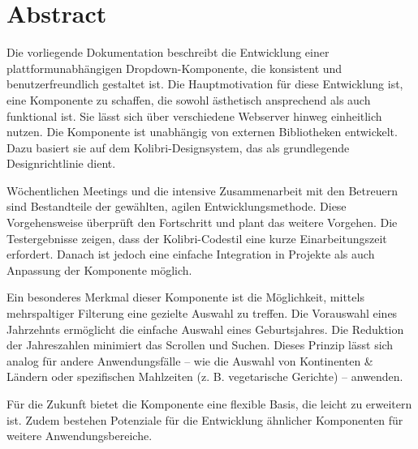 \chapter*{Abstract}

Die vorliegende Dokumentation beschreibt die Entwicklung einer plattformunabhängigen Dropdown-Komponente, die konsistent und benutzerfreundlich gestaltet ist. 
Die Hauptmotivation für diese Entwicklung ist, eine Komponente zu schaffen, die sowohl ästhetisch ansprechend als auch funktional ist. 
Sie lässt sich über verschiedene Webserver hinweg einheitlich nutzen. 
Die Komponente ist unabhängig von externen Bibliotheken entwickelt. 
Dazu basiert sie auf dem Kolibri-Designsystem, das als grundlegende Designrichtlinie dient. 

Wöchentlichen Meetings und die intensive Zusammenarbeit mit den Betreuern sind Bestandteile der gewählten, agilen Entwicklungsmethode. 
Diese Vorgehensweise überprüft den Fortschritt und plant das weitere Vorgehen. 
Die Testergebnisse zeigen, dass der Kolibri-Codestil eine kurze Einarbeitungszeit erfordert. 
Danach ist jedoch eine einfache Integration in Projekte als auch Anpassung der Komponente möglich. 

Ein besonderes Merkmal dieser Komponente ist die Möglichkeit, mittels mehrspaltiger Filterung eine gezielte Auswahl zu treffen. 
Die Vorauswahl eines Jahrzehnts ermöglicht die einfache Auswahl eines Geburtsjahres. 
Die Reduktion der Jahreszahlen minimiert das Scrollen und Suchen. 
Dieses Prinzip lässt sich analog für andere Anwendungsfälle – wie die Auswahl von Kontinenten \& Ländern oder spezifischen Mahlzeiten (z. B. vegetarische Gerichte) – anwenden. 

Für die Zukunft bietet die Komponente eine flexible Basis, die leicht zu erweitern ist. 
Zudem bestehen Potenziale für die Entwicklung ähnlicher Komponenten für weitere Anwendungsbereiche. 

